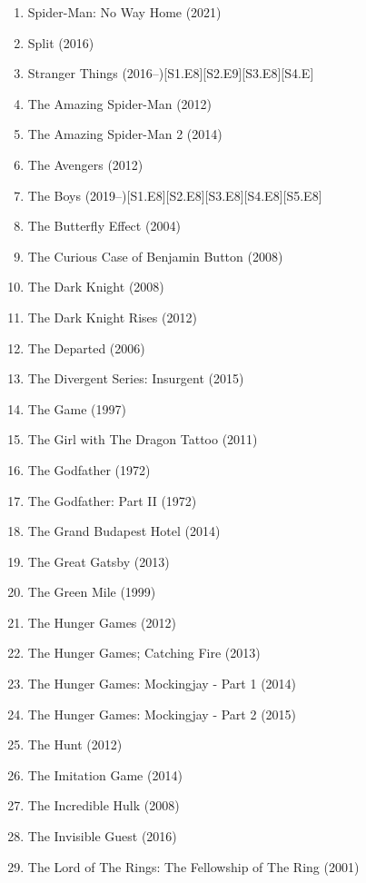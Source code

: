\documentclass{article}
\begin{document}
\begin{enumerate}
\begin{itemize}
		{\bf Peter B. Parker}: ``{\it You won't. It's a leap of faith. That's all it is, Miles. A leap of faith}.''
	\end{itemize}
	\item {\sc Spider-Man: No Way Home} (2021)
	\item {\sc Split} (2016)
	\item Stranger Things (2016--)\hfill[S1.E8][S2.E9][S3.E8][S4.E]
	\item {\sc The Amazing Spider-Man} (2012)
	\item {\sc The Amazing Spider-Man 2} (2014)
	\item {\sc The Avengers} (2012)
	\item {\sc The Boys} (2019--)\hfill[S1.E8][S2.E8][S3.E8][S4.E8][S5.E8]
	\item {\sc The Butterfly Effect} (2004)
	\item {\sc The Curious Case of Benjamin Button} (2008)
	\item {\sc The Dark Knight} (2008)
	\item {\sc The Dark Knight Rises} (2012)
	\item {\sc The Departed} (2006)
	\item {\sc The Divergent Series: Insurgent} (2015)
	\item {\sc The Game} (1997)
	\item {\sc The Girl with The Dragon Tattoo} (2011)
	\item {\sc The Godfather} (1972)
	\item {\sc The Godfather: Part II} (1972)
	\item {\sc The Grand Budapest Hotel} (2014)
	\item {\sc The Great Gatsby} (2013)
	\item {\sc The Green Mile} (1999)
	\item {\sc The Hunger Games} (2012)
	\item {\sc The Hunger Games; Catching Fire} (2013)
	\item {\sc The Hunger Games: Mockingjay - Part 1} (2014)
	\item {\sc The Hunger Games: Mockingjay - Part 2} (2015)
	\item {\sc The Hunt} (2012)
	\item {\sc The Imitation Game} (2014)
	\item {\sc The Incredible Hulk} (2008)
	\item {\sc The Invisible Guest} (2016)
	\item {\sc The Lord of The Rings: The Fellowship of The Ring} (2001)

\end{enumerate}
\end{document}
